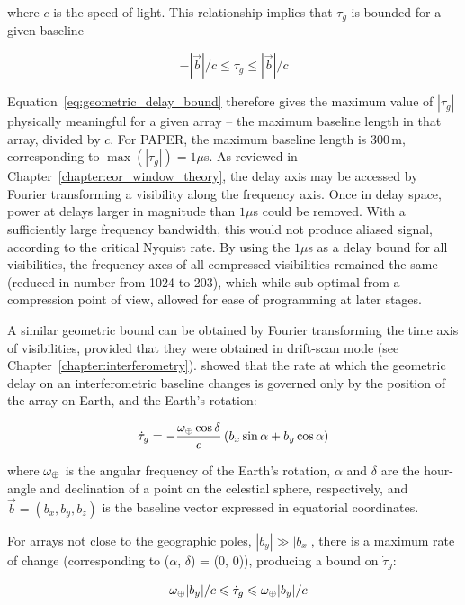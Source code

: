 where $c$ is the speed of light. This relationship implies that $\tau_g$ is bounded for a given baseline

\begin{equation}
- |\vec{b}|/c \leqslant \tau_g \leqslant |\vec{b}|/c
\label{eq:geometric_delay_bound}
\end{equation}

Equation~\ref{eq:geometric_delay_bound} therefore gives the maximum value of $|\tau_g|$ physically meaningful for a given array -- the maximum baseline length in that array, divided by $c$. For PAPER, the maximum baseline length is 300\,m, corresponding to $\max(|\tau_g|) = 1\mu$s. 
As reviewed in Chapter~\ref{chapter:eor_window_theory}, the delay axis may be accessed by Fourier transforming a visibility along the frequency axis. Once in delay space, power at delays larger in magnitude than $1 \mu$s could be removed. With a sufficiently large frequency bandwidth, this would not produce aliased signal, according to the critical Nyquist rate. By using the $1 \mu$s as a delay bound for all visibilities, the frequency axes of all compressed visibilities remained the same (reduced in number from 1024 to 203), which while sub-optimal from a compression point of view, allowed for ease of programming at later stages.

A similar geometric bound can be obtained by Fourier transforming the time axis of visibilities, provided that they were obtained in drift-scan mode (see Chapter~\ref{chapter:interferometry}). \cite{ParsonsBacker.09} showed that the rate at which the geometric delay on an interferometric baseline changes is governed only by the position of the array on Earth, and the Earth's rotation:

\begin{equation}
\dot{\tau}_g = -\frac{\omega_{\oplus} \cos\delta}{c} \left( b_x\sin\alpha + b_y\cos\alpha\right)
\end{equation}

where $\omega_{\oplus}$ is the angular frequency of the Earth's rotation, $\alpha$ and $\delta$ are the hour-angle and declination of a point on the celestial sphere, respectively, and $\vec{b}=(b_x,b_y,b_z)$ is the baseline vector expressed in equatorial coordinates.

For arrays not close to the geographic poles, $|b_y| \gg |b_x|$, there is a maximum rate of change (corresponding to ($\alpha$, $\delta$) = (0, 0)), producing a bound on $\dot{\tau}_g$:

\begin{equation}
- \omega_{\oplus}|b_y|/c \leqslant \dot{\tau}_g\leqslant \omega_{\oplus} |b_y|/c
\label{eq:geometric_delay_rate_bound}
\end{equation}

